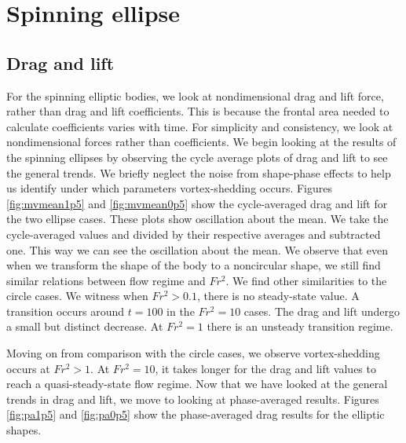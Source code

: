 \section{Spinning ellipse}
\label{section:Spinning_ellipse}
\subsection{Drag and lift}
For the spinning elliptic bodies, we look at nondimensional drag and lift force, rather than drag and lift coefficients. This is because the frontal area needed to calculate coefficients varies with time. For simplicity and consistency, we look at nondimensional forces rather than coefficients. We begin looking at the results of the spinning ellipses by observing the cycle average plots of drag and lift to see the general trends. We briefly neglect the noise from shape-phase effects to help us identify under which parameters vortex-shedding occurs. Figures \ref{fig:mvmean1p5} and \ref{fig:mvmean0p5} show the cycle-averaged drag and lift for the two ellipse cases. These plots show oscillation about the mean. We take the cycle-averaged values and divided by their respective averages and subtracted one. This way we can see the oscillation about the mean. We observe that even when we transform the shape of the body to a noncircular shape, we still find similar relations between flow regime and $Fr^2$. We find other similarities to the circle cases. We witness when $Fr^2 > 0.1$, there is no steady-state value. A transition occurs around $t = 100$ in the $Fr^2 = 10$ cases. The drag and lift undergo a small but distinct decrease. At $Fr^2 = 1$ there is an unsteady transition regime. 

Moving on from comparison with the circle cases, we observe vortex-shedding occurs at $Fr^2 > 1$. At $Fr^2 = 10$, it takes longer for the drag and lift values to reach a quasi-steady-state flow regime. Now that we have looked at the general trends in drag and lift, we move to looking at phase-averaged results. Figures \ref{fig:pa1p5} and \ref{fig:pa0p5} show the phase-averaged drag results for the elliptic shapes. 

